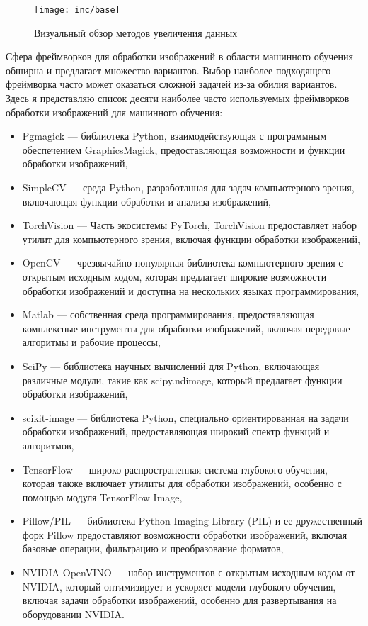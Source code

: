\begin{figure}
  \texttt{[image: inc/base]}
  \caption{Визуальный обзор методов увеличения данных}
  \label{fig:fig02}
\end{figure}

Сфера фреймворков для обработки изображений в области машинного обучения обширна и предлагает множество вариантов. Выбор наиболее подходящего фреймворка часто может оказаться сложной задачей из-за обилия вариантов. Здесь я представляю список десяти наиболее часто используемых фреймворков обработки изображений для машинного обучения:


\begin{itemize}
    \item Pgmagick --- библиотека Python, взаимодействующая с программным обеспечением GraphicsMagick, предоставляющая возможности и функции обработки изображений,
    \item SimpleCV --- среда Python, разработанная для задач компьютерного зрения, включающая функции обработки и анализа изображений,
    \item TorchVision --- Часть экосистемы PyTorch, TorchVision предоставляет набор утилит для компьютерного зрения, включая функции обработки изображений,
    \item OpenCV --- чрезвычайно популярная библиотека компьютерного зрения с открытым исходным кодом, которая предлагает широкие возможности обработки изображений и доступна на нескольких языках программирования,
    \item Matlab --- собственная среда программирования, предоставляющая комплексные инструменты для обработки изображений, включая передовые алгоритмы и рабочие процессы,
    \item SciPy --- библиотека научных вычислений для Python, включающая различные модули, такие как scipy.ndimage, который предлагает функции обработки изображений,
    \item scikit-image --- библиотека Python, специально ориентированная на задачи обработки изображений, предоставляющая широкий спектр функций и алгоритмов,
    \item TensorFlow --- широко распространенная система глубокого обучения, которая также включает утилиты для обработки изображений, особенно с помощью модуля TensorFlow Image,
    \item Pillow/PIL --- библиотека Python Imaging Library (PIL) и ее дружественный форк Pillow предоставляют возможности обработки изображений, включая базовые операции, фильтрацию и преобразование форматов,
    \item NVIDIA OpenVINO --- набор инструментов с открытым исходным кодом от NVIDIA, который оптимизирует и ускоряет модели глубокого обучения, включая задачи обработки изображений, особенно для развертывания на оборудовании NVIDIA.
\end{itemize}

